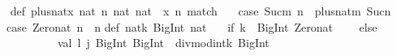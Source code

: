 \begin{isabellebody}
\begin{isamarkuptext}
\ \ {}{}{}{}{}\isanewline
\isanewline
def\ plus{}nat{}x{}{}\ nat{}\ n{}\ nat{}{}\ nat\ {}\ {}x{}{}\ n{}\ match\ {}\isanewline
\ \ case\ {}Suc{}m{}{}\ n{}\ {}{}\ plus{}nat{}m{}\ Suc{}n{}{}\isanewline
\ \ case\ {}Zero{}nat{}\ n{}\ {}{}\ n\isanewline
{}\isanewline
\isanewline
def\ nat{}k{}\ BigInt{}{}\ nat\ {}\isanewline
\ \ {}if\ {}k\ {}{}\ BigInt{}{}{}{}\ Zero{}nat\isanewline
\ \ \ \ else\ {}\isanewline
\ \ \ \ \ \ \ \ \ \ \ val\ {}l{}\ j{}{}\ {}BigInt{}\ BigInt{}\ {}\ divmod{}int{}k{}\ BigInt{}{}{}{}\isanewline

\end{isamarkuptext}
\end{isabellebody}
